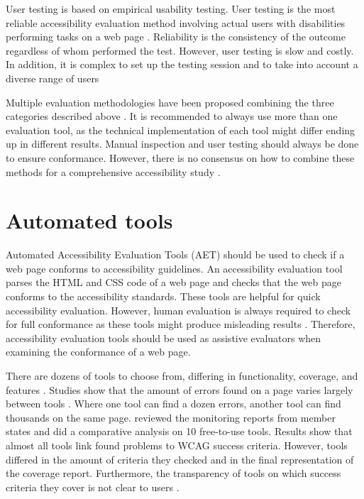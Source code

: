 User testing is based on empirical usability testing. User testing is the most reliable accessibility evaluation method involving actual users with disabilities performing tasks on a web page \citep[Chapter~26.2]{webaccessibility}. Reliability is the consistency of the outcome regardless of whom performed the test. However, user testing is slow and costly. In addition, it is complex to set up the testing session and to take into account a diverse range of users \citep{comparative_accessibility_methods}

Multiple evaluation methodologies have been proposed combining the three categories described above \citep[Chapter~26.2.1]{webaccessibility}. It is recommended to always use more than one evaluation tool, as the technical implementation of each tool might differ ending up in different results. Manual inspection and user testing should always be done to ensure conformance. However, there is no consensus on how to combine these methods for a comprehensive accessibility study \citep[Chapter~26.2.1]{webaccessibility}.

\section{Automated tools\label{automated_tools}}

Automated Accessibility Evaluation Tools (AET) should be used to check if a web page conforms to accessibility guidelines. An accessibility evaluation tool parses the HTML and CSS code of a web page and checks that the web page conforms to the accessibility standards. These tools are helpful for quick accessibility evaluation. However, human evaluation is always required to check for full conformance as these tools might produce misleading results \citep{wcagevaluationtools}. Therefore, accessibility evaluation tools should be used as assistive evaluators when examining the conformance of a web page.

There are dozens of tools to choose from, differing in functionality, coverage, and features \citep{tool_list}. Studies show that the amount of errors found on a page varies largely between tools \citep{comparison_10.1145/3371300.3383346, comparison_10.1145/3607720.3607722, tool_analysis_directive}. Where one tool can find a dozen errors, another tool can find thousands on the same page. \textcite{tool_analysis_directive} reviewed the monitoring reports from member states and did a comparative analysis on 10 free-to-use tools. Results show that almost all tools link found problems to WCAG success criteria. However, tools differed in the amount of criteria they checked and in the final representation of the coverage report. Furthermore, the transparency of tools on which success criteria they cover is not clear to users \citep{tool_analysis_directive}.

